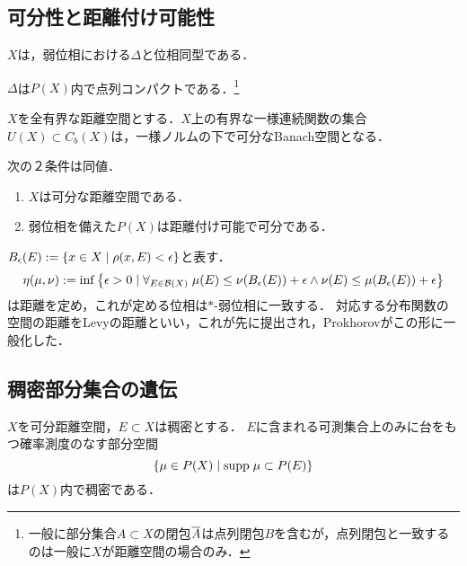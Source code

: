 \documentclass[uplatex,dvipdfmx]{jsreport}
\begin{document}
\subsection{可分性と距離付け可能性}

\begin{lemma}
    $X$は，弱位相における$\Delta$と位相同型である．
\end{lemma}

\begin{lemma}
    $\Delta$は$P(X)$内で点列コンパクトである．\footnote{一般に部分集合$A\subset X$の閉包$\overline{A}$は点列閉包$B$を含むが，点列閉包と一致するのは一般に$X$が距離空間の場合のみ．}
\end{lemma}

\begin{lemma}
    $X$を全有界な距離空間とする．$X$上の有界な一様連続関数の集合$U(X)\subset C_b(X)$は，一様ノルムの下で可分なBanach空間となる．
\end{lemma}

\begin{theorem}[確率測度の空間の弱位相の距離化可能性]\label{thm-metrizability-of-P(X)-in-weak-topology}
    次の２条件は同値．
    \begin{enumerate}
        \item $X$は可分な距離空間である．
        \item 弱位相を備えた$P(X)$は距離付け可能で可分である．
    \end{enumerate}
\end{theorem}

\begin{example}
    $B_\epsilon(E):=\{x\in X\mid\rho(x,E)<\epsilon\}$と表す．
    \[\eta(\mu,\nu):=\inf\left\{\epsilon>0\mid\forall_{E\in\mathcal{B}(X)}\;\mu(E)\le\nu(B_\epsilon(E))+\epsilon\land\nu(E)\le\mu(B_\epsilon(E))+\epsilon\right\}\]
    は距離を定め，これが定める位相は$*$-弱位相に一致する．
    対応する分布関数の空間の距離をLevyの距離といい，これが先に提出され，Prokhorovがこの形に一般化した．
\end{example}

\subsection{稠密部分集合の遺伝}

\begin{theorem}
    $X$を可分距離空間，$E\subset X$は稠密とする．
    $E$に含まれる可測集合上のみに台をもつ確率測度のなす部分空間
    \[\left\{\mu\in P(X)\mid\mathrm{supp}\;\mu\subset P(E)\right\}\]
    は$P(X)$内で稠密である．
\end{theorem}
\end{document}
